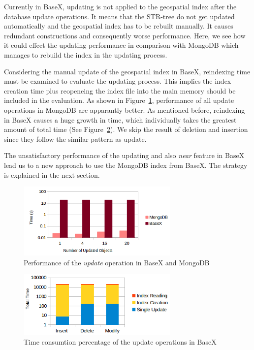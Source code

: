 \documentclass[a4paper,12pt]{article}
\begin{document}
Currently in BaseX, updating is not applied to the geospatial index after the database update operations. It means that the STR-tree do not get updated automatically and the geospatial index has to be rebuilt manually. It causes redundant constructions and consequently worse performance. Here, we see how it could effect the updating performance in comparison with MongoDB which manages to rebuild the index in the updating process.

Considering the manual update of the geospatial index in BaseX, reindexing time must be examined to evaluate the updating process. This implies the index creation time plus reopeneing the index file into the main memory should be included in the evaluation. 
As shown in Figure~\ref{figBXvsMongoUpdate}, performance of all update operations in MongoDB are apparantly better. As mentioned before, reindexing in BaseX causes a huge growth in time, which individually takes the greatest amount of total time (See Figure~\ref{figBXUpdate}). We skip the result of deletion and insertion since they follow the similar pattern as update.

The unsatisfactory performance of the updating and also \textit{near} feature in BaseX lead us to a new approach to use the MongoDB index from BaseX. The strategy is explained in the next section.

 


\begin{figure}
\centering
\includegraphics[width=0.7\textwidth]{BXvsMongo-Update-sec.png}
\caption{Performance of the \textit{update} operation in BaseX and MongoDB}
\label{figBXvsMongoUpdate}
\end{figure}


\begin{figure}
\centering
\includegraphics[width=0.7\textwidth]{BXUpdate.png}
\caption{Time consumtion percentage of the update operations in BaseX}
\label{figBXUpdate}
\end{figure}
\end{document}
